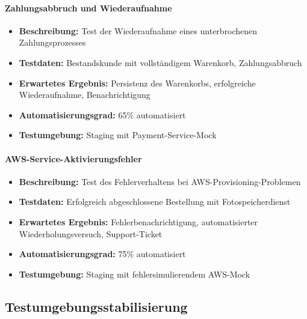 \paragraph{Zahlungsabbruch und Wiederaufnahme}
\begin{itemize}
\item \textbf{Beschreibung:} Test der Wiederaufnahme eines unterbrochenen Zahlungsprozesses
\item \textbf{Testdaten:} Bestandskunde mit vollständigem Warenkorb, Zahlungsabbruch
\item \textbf{Erwartetes Ergebnis:} Persistenz des Warenkorbs, erfolgreiche Wiederaufnahme, Benachrichtigung
\item \textbf{Automatisierungsgrad:} 65\% automatisiert
\item \textbf{Testumgebung:} Staging mit Payment-Service-Mock
\end{itemize}
\paragraph{AWS-Service-Aktivierungsfehler}
\begin{itemize}
\item \textbf{Beschreibung:} Test des Fehlerverhaltens bei AWS-Provisioning-Problemen
\item \textbf{Testdaten:} Erfolgreich abgeschlossene Bestellung mit Fotospeicherdienst
\item \textbf{Erwartetes Ergebnis:} Fehlerbenachrichtigung, automatisierter Wiederholungsversuch, Support-Ticket
\item \textbf{Automatisierungsgrad:} 75\% automatisiert
\item \textbf{Testumgebung:} Staging mit fehlersimulierendem AWS-Mock
\end{itemize}


\subsection{Testumgebungsstabilisierung}

